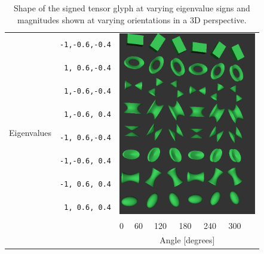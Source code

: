 \documentclass{InsightArticle}
\begin{document}
%
%

\renewcommand{\arraystretch}{2.09}
\begin{table}[ht]
  \begin{tabular}{cc p{0.01cm}p{0.4cm}p{0.5cm}p{0.5cm}p{0.5cm}p{0.5cm}p{0.5cm}}
    \hline
    \multirow{9}{*}{Eigenvalues}
    &\texttt{-1,-0.6,-0.4}&\multicolumn{7}{l}{\multirow{8}{*}{\includegraphics[width=6cm]{SignedEigenvalueTensorGlyphMatrix}}} \\
    &\texttt{ 1, 0.6,-0.4}& & & & & & & \\
    &\texttt{ 1,-0.6,-0.4}& & & & & & & \\
    &\texttt{ 1,-0.6, 0.4}& & & & & & & \\
    &\texttt{-1, 0.6,-0.4}& & & & & & & \\
    &\texttt{-1,-0.6, 0.4}& & & & & & & \\
    &\texttt{-1, 0.6, 0.4}& & & & & & & \\
    &\texttt{ 1, 0.6, 0.4}& & & & & & & \\
    \hline
    \multicolumn{2}{c}{}& & 0 & 60 & 120 & 180 & 240 & 300 \\ [-1.1em]
    \multicolumn{2}{c}{}& \multicolumn{7}{c}{Angle [degrees]} \\
    \cline{3-9}
  \end{tabular}
  \caption{Shape of the signed tensor glyph at varying eigenvalue signs and
  magnitudes shown at varying orientations in a 3D perspective.}
  \label{tab:signed-flavors}
\end{table}
\end{document}
